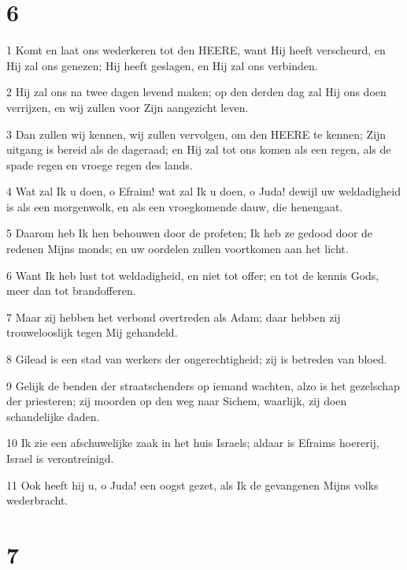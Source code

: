 \chapter{6}

\par 1 Komt en laat ons wederkeren tot den HEERE, want Hij heeft verscheurd, en Hij zal ons genezen; Hij heeft geslagen, en Hij zal ons verbinden.
\par 2 Hij zal ons na twee dagen levend maken; op den derden dag zal Hij ons doen verrijzen, en wij zullen voor Zijn aangezicht leven.
\par 3 Dan zullen wij kennen, wij zullen vervolgen, om den HEERE te kennen; Zijn uitgang is bereid als de dageraad; en Hij zal tot ons komen als een regen, als de spade regen en vroege regen des lands.
\par 4 Wat zal Ik u doen, o Efraim! wat zal Ik u doen, o Juda! dewijl uw weldadigheid is als een morgenwolk, en als een vroegkomende dauw, die henengaat.
\par 5 Daarom heb Ik hen behouwen door de profeten; Ik heb ze gedood door de redenen Mijns monds; en uw oordelen zullen voortkomen aan het licht.
\par 6 Want Ik heb lust tot weldadigheid, en niet tot offer; en tot de kennis Gods, meer dan tot brandofferen.
\par 7 Maar zij hebben het verbond overtreden als Adam; daar hebben zij trouwelooslijk tegen Mij gehandeld.
\par 8 Gilead is een stad van werkers der ongerechtigheid; zij is betreden van bloed.
\par 9 Gelijk de benden der straatschenders op iemand wachten, alzo is het gezelschap der priesteren; zij moorden op den weg naar Sichem, waarlijk, zij doen schandelijke daden.
\par 10 Ik zie een afschuwelijke zaak in het huis Israels; aldaar is Efraims hoererij, Israel is verontreinigd.
\par 11 Ook heeft hij u, o Juda! een oogst gezet, als Ik de gevangenen Mijns volks wederbracht.

\chapter{7}

